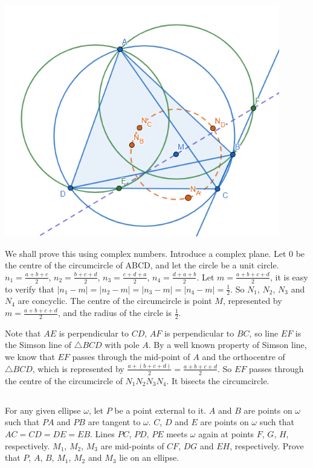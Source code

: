\documentclass[12pt]{article}
\begin{document}
\subsection*{}
\begin{center}
    \includegraphics[width = 12cm]{Figure1.2.png}
\end{center}
We shall prove this using complex numbers. Introduce a complex plane. Let 0 be the centre of the circumcircle of ABCD, and let the circle be a unit circle. $n_1=\frac{a+b+c}{2}$, $n_2=\frac{b+c+d}{2}$, $n_3=\frac{c+d+a}{2}$, $n_4=\frac{d+a+b}{2}$. Let $m=\frac{a+b+c+d}{2}$, it is easy to verify that $|n_1-m|=|n_2-m|=|n_3-m|=|n_4-m|=\frac{1}{2}$. So $N_1$, $N_2$, $N_3$ and $N_4$ are concyclic. The centre of the circumcircle is point $M$, represented by $m=\frac{a+b+c+d}{2}$, and the radius of the circle is $\frac{1}{2}$. 

Note that $AE$ is perpendicular to $CD$, $AF$ is perpendicular to $BC$, so line $EF$ is the Simson line of $\triangle BCD$ with pole $A$. By a well known property of Simson line, we know that $EF$ passes through the mid-point of $A$ and the orthocentre of $\triangle BCD$, which is represented by $\frac{a+(b+c+d)}{2}=\frac{a+b+c+d}{2}$. So $EF$ passes through the centre of the circumcircle of $N_1 N_2 N_3 N_4$. It bisects the circumcircle.  


\subsection*{}
For any given ellipse $\omega$, let $P$ be a point external to it. $A$ and $B$ are points on $\omega$ such that $PA$ and $PB$ are tangent to $\omega$. $C$, $D$ and $E$ are points on $\omega$ such that $AC=CD=DE=EB$. Lines $PC$, $PD$, $PE$ meets $\omega$ again at points $F$, $G$, $H$, respectively. $M_1$, $M_2$, $M_3$ are mid-points of $CF$, $DG$ and $EH$, respectively. Prove that $P$, $A$, $B$, $M_1$, $M_2$ and $M_3$ lie on an ellipse.
\end{document}

